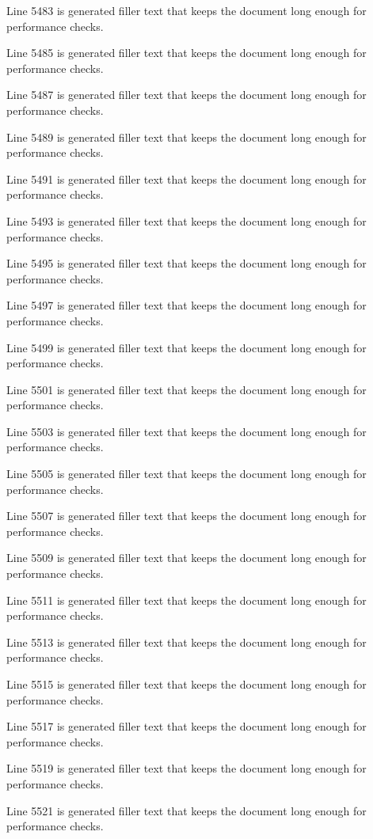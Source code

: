 Line 5483 is generated filler text that keeps the document long enough for performance checks.

Line 5485 is generated filler text that keeps the document long enough for performance checks.

Line 5487 is generated filler text that keeps the document long enough for performance checks.

Line 5489 is generated filler text that keeps the document long enough for performance checks.

Line 5491 is generated filler text that keeps the document long enough for performance checks.

Line 5493 is generated filler text that keeps the document long enough for performance checks.

Line 5495 is generated filler text that keeps the document long enough for performance checks.

Line 5497 is generated filler text that keeps the document long enough for performance checks.

Line 5499 is generated filler text that keeps the document long enough for performance checks.

Line 5501 is generated filler text that keeps the document long enough for performance checks.

Line 5503 is generated filler text that keeps the document long enough for performance checks.

Line 5505 is generated filler text that keeps the document long enough for performance checks.

Line 5507 is generated filler text that keeps the document long enough for performance checks.

Line 5509 is generated filler text that keeps the document long enough for performance checks.

Line 5511 is generated filler text that keeps the document long enough for performance checks.

Line 5513 is generated filler text that keeps the document long enough for performance checks.

Line 5515 is generated filler text that keeps the document long enough for performance checks.

Line 5517 is generated filler text that keeps the document long enough for performance checks.

Line 5519 is generated filler text that keeps the document long enough for performance checks.

Line 5521 is generated filler text that keeps the document long enough for performance checks.

